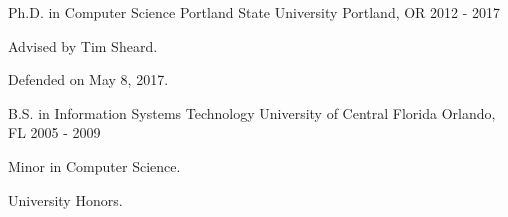 

\begin{cventries}

  \cventry
    {Ph.D. in Computer Science} %
    {Portland State University} %
    {Portland, OR} %
    {2012 - 2017} %
    {
      \begin{cvitems} %
        \item {Advised by Tim Sheard.}
        \item {Defended on May 8, 2017.}
      \end{cvitems}
    }



  \cventry
    {B.S. in Information Systems Technology} %
    {University of Central Florida} %
    {Orlando, FL} %
    {2005 - 2009} %
    {
      \begin{cvitems} %
        \item {Minor in Computer Science.}
        \item {University Honors.}
      \end{cvitems}
    }

\end{cventries}
